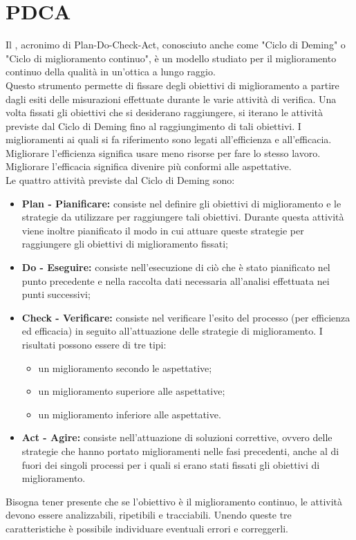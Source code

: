 \documentclass[PianoDiQualifica.tex]{subfiles}
\begin{document}
\section{PDCA}
Il , acronimo di Plan-Do-Check-Act, conosciuto anche come "Ciclo di
Deming" o "Ciclo di miglioramento continuo", è un modello studiato per il
miglioramento continuo della qualità in un’ottica a lungo raggio.\\ 
Questo strumento permette di fissare degli obiettivi di miglioramento a partire dagli esiti delle misurazioni effettuate durante le varie attività di verifica.
Una volta fissati gli obiettivi che si desiderano raggiungere, si iterano le attività previste dal Ciclo di Deming fino al raggiungimento di tali obiettivi.
I miglioramenti ai quali si fa riferimento sono legati all’efficienza e all’efficacia. Migliorare l’efficienza significa usare meno risorse per fare lo stesso
lavoro. Migliorare l’efficacia significa divenire più conformi alle aspettative.\\
Le quattro attività previste dal Ciclo di Deming sono:
\begin{itemize}
\item \textbf{Plan - Pianificare:} consiste nel definire gli obiettivi di miglioramento
e le strategie da utilizzare per raggiungere tali obiettivi. Durante questa
attività viene inoltre pianificato il modo in cui attuare queste strategie
per raggiungere gli obiettivi di miglioramento fissati;
\item \textbf{Do - Eseguire:} consiste nell'esecuzione di ciò che è stato pianificato nel punto precedente e nella raccolta dati necessaria all'analisi effettuata nei punti successivi;
\item \textbf{ Check - Verificare:} consiste nel verificare l’esito del processo (per
efficienza ed efficacia) in seguito all’attuazione delle strategie di miglioramento. I risultati possono essere di tre tipi:
\begin{itemize}
\item un miglioramento secondo le aspettative;
\item un miglioramento superiore alle aspettative;
\item un miglioramento inferiore alle aspettative.
\end{itemize}
\item \textbf{ Act - Agire:} consiste nell’attuazione di soluzioni correttive, ovvero delle strategie che hanno portato miglioramenti nelle fasi precedenti, anche al di fuori dei singoli processi per i quali si erano stati fissati gli obiettivi di miglioramento.
\end{itemize}

Bisogna tener presente che se l’obiettivo è il miglioramento continuo, le attività devono essere analizzabili, ripetibili e tracciabili. Unendo queste tre
caratteristiche è possibile individuare eventuali errori e correggerli.
\end{document}
